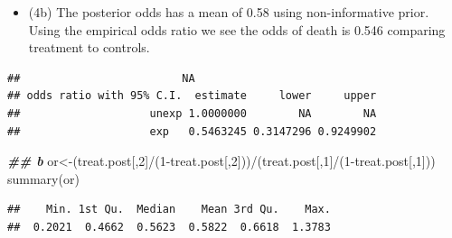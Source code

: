 \documentclass[
]{book}
\newenvironment{Shaded}{\begin{snugshade}}{\end{snugshade}}
\newcommand{\AttributeTok}[1]{\textcolor[rgb]{0.77,0.63,0.00}{#1}}
\newcommand{\DecValTok}[1]{\textcolor[rgb]{0.00,0.00,0.81}{#1}}
\newcommand{\DocumentationTok}[1]{\textcolor[rgb]{0.56,0.35,0.01}{\textbf{\textit{#1}}}}
\newcommand{\FunctionTok}[1]{\textcolor[rgb]{0.00,0.00,0.00}{#1}}
\newcommand{\NormalTok}[1]{#1}
\newcommand{\OtherTok}[1]{\textcolor[rgb]{0.56,0.35,0.01}{#1}}
\newcommand{\SpecialCharTok}[1]{\textcolor[rgb]{0.00,0.00,0.00}{#1}}
\newcommand{\StringTok}[1]{\textcolor[rgb]{0.31,0.60,0.02}{#1}}
\providecommand{\tightlist}{%
  \setlength{\itemsep}{0pt}\setlength{\parskip}{0pt}}
\theoremstyle{definition}
\theoremstyle{definition}
\theoremstyle{definition}
\theoremstyle{definition}
\theoremstyle{remark}
\begin{document}
\begin{itemize}
\tightlist
\item
  (4b) The posterior odds has a mean of 0.58 using non-informative prior. Using the empirical odds ratio we see the odds of death is 0.546 comparing treatment to controls.
\end{itemize}

\begin{Shaded}
\end{Shaded}

\begin{verbatim}
##                         NA
## odds ratio with 95% C.I.  estimate     lower     upper
##                    unexp 1.0000000        NA        NA
##                    exp   0.5463245 0.3147296 0.9249902
\end{verbatim}

\begin{Shaded}
\begin{Highlighting}[]
  \DocumentationTok{\#\# b}
\NormalTok{  or}\OtherTok{\textless{}{-}}\NormalTok{(treat.post[,}\DecValTok{2}\NormalTok{]}\SpecialCharTok{/}\NormalTok{(}\DecValTok{1}\SpecialCharTok{{-}}\NormalTok{treat.post[,}\DecValTok{2}\NormalTok{]))}\SpecialCharTok{/}\NormalTok{(treat.post[,}\DecValTok{1}\NormalTok{]}\SpecialCharTok{/}\NormalTok{(}\DecValTok{1}\SpecialCharTok{{-}}\NormalTok{treat.post[,}\DecValTok{1}\NormalTok{]))}
\FunctionTok{summary}\NormalTok{(or)}
\end{Highlighting}
\end{Shaded}

\begin{verbatim}
##    Min. 1st Qu.  Median    Mean 3rd Qu.    Max. 
##  0.2021  0.4662  0.5623  0.5822  0.6618  1.3783
\end{verbatim}
\end{document}

